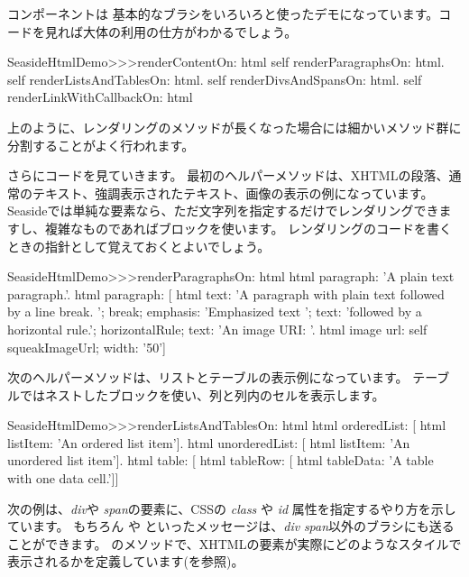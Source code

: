 \documentclass[a4paper,10pt,twoside]{book}
\begin{document}
コンポーネントは 基本的なブラシをいろいろと使ったデモになっています。コードを見れば大体の利用の仕方がわかるでしょう。

\begin{code}{}
SeasideHtmlDemo>>>renderContentOn: html 
	self renderParagraphsOn: html.
	self renderListsAndTablesOn: html.
	self renderDivsAndSpansOn: html.
	self renderLinkWithCallbackOn: html
\end{code}

上のように、レンダリングのメソッドが長くなった場合には細かいメソッド群に分割することがよく行われます。


さらにコードを見ていきます。
最初のヘルパーメソッドは、XHTMLの段落、通常のテキスト、強調表示されたテキスト、画像の表示の例になっています。
Seasideでは単純な要素なら、ただ文字列を指定するだけでレンダリングできますし、複雑なものであればブロックを使います。
レンダリングのコードを書くときの指針として覚えておくとよいでしょう。

\begin{code}{}
SeasideHtmlDemo>>>renderParagraphsOn: html 
	html paragraph: 'A plain text paragraph.'.
	html paragraph: [
		html
			text: 'A paragraph with plain text followed by a line break. ';
			break;
			emphasis: 'Emphasized text ';
			text: 'followed by a horizontal rule.';
			horizontalRule;
			text: 'An image URI: '.
		html image
			url: self squeakImageUrl;
			width: '50']
\end{code}

次のヘルパーメソッドは、リストとテーブルの表示例になっています。 
テーブルではネストしたブロックを使い、列と列内のセルを表示します。

\begin{code}{}
SeasideHtmlDemo>>>renderListsAndTablesOn: html 
	html orderedList: [
		html listItem: 'An ordered list item'].
	html unorderedList: [
		html listItem: 'An unordered list item'].
	html table: [
		html tableRow: [
			html tableData: 'A table with one data cell.']]
\end{code}

次の例は、\emph{div}や \emph{span}の要素に、CSSの \emph{class} や \emph{id} 属性を指定するやり方を示しています。
もちろん  や  といったメッセージは、\emph{div} \emph{span}以外のブラシにも送ることができます。
 のメソッドで、XHTMLの要素が実際にどのようなスタイルで表示されるかを定義しています(を参照)。
\end{document}
